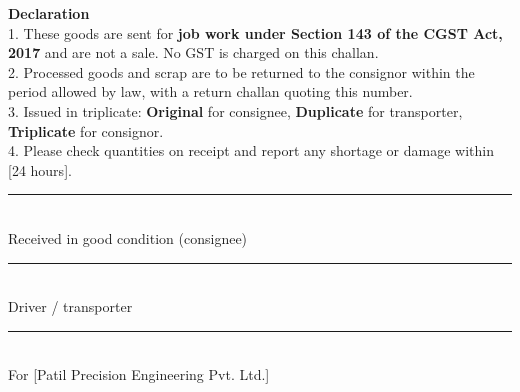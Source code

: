 \documentclass[10pt]{article}
\begin{document}
\noindent\colorbox{notebg}{\parbox{\dimexpr\linewidth-2\fboxsep}{\footnotesize {\color{accent}\bfseries Declaration}\\ 1. These goods are sent for \textbf{job work under Section 143 of the CGST Act, 2017} and are not a sale. No GST is charged on this challan.\\ 2. Processed goods and scrap are to be returned to the consignor within the period allowed by law, with a return challan quoting this number.\\ 3. Issued in triplicate: \textbf{Original} for consignee, \textbf{Duplicate} for transporter, \textbf{Triplicate} for consignor.\\ 4. Please check quantities on receipt and report any shortage or damage within [24 hours].}}\par\vspace{6pt}

\vspace{32pt}\noindent\parbox[t]{0.3\linewidth}{\centering\rule{\linewidth}{0.5pt}\\ Received in good condition (consignee)}\hfill\parbox[t]{0.3\linewidth}{\centering\rule{\linewidth}{0.5pt}\\ Driver / transporter}\hfill\parbox[t]{0.3\linewidth}{\centering\rule{\linewidth}{0.5pt}\\ For [Patil Precision Engineering Pvt. Ltd.]}\par
\end{document}
